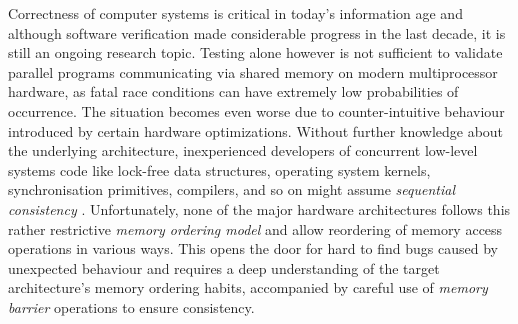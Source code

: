 Correctness of computer systems is critical in today's information age and although software verification made considerable progress in the last decade, it is still an ongoing research topic.
Testing alone however is not sufficient to validate parallel programs
communicating via shared memory on modern multiprocessor hardware,
as fatal race conditions can have extremely low probabilities of occurrence.
The situation becomes even worse due to counter-intuitive behaviour introduced by certain hardware optimizations.
Without further knowledge about the underlying architecture, inexperienced developers of
concurrent
low-level
systems code like lock-free data structures, operating system kernels, synchronisation
primitives,
compilers,
and so on
might assume
\emph{sequential consistency} \cite{ref:Lamport79}.
Unfortunately, none of the major hardware architectures follows this rather restrictive \emph{memory ordering model} and allow
reordering of memory access operations
in various ways.
This opens the door for hard to find bugs caused by unexpected
behaviour
and
requires a deep understanding of the target architecture's memory ordering habits,
accompanied by careful use of \emph{memory barrier} operations to ensure consistency.



